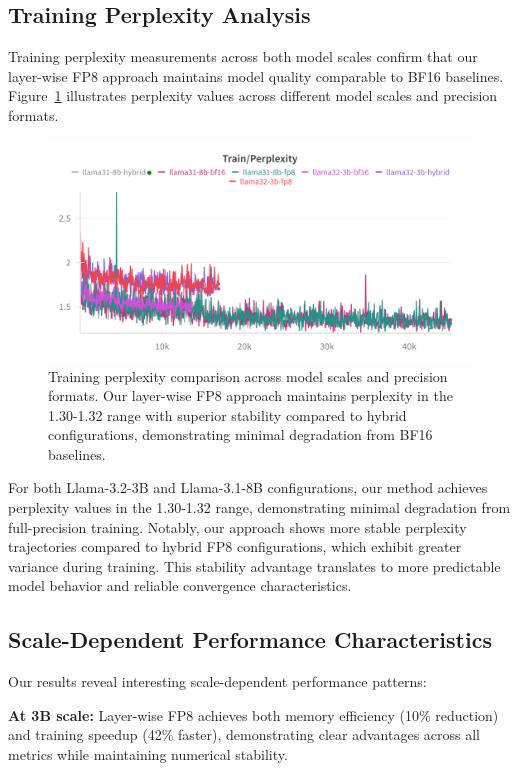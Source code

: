 \subsection{Training Perplexity Analysis}

Training perplexity measurements across both model scales confirm that our layer-wise FP8 approach maintains model quality comparable to BF16 baselines. Figure~\ref{fig:training_perplexity} illustrates perplexity values across different model scales and precision formats.

\begin{figure}[h]
    \centering
    \includegraphics[width=0.9\linewidth]{figures/c4/train_perplexity.png}
    \caption{Training perplexity comparison across model scales and precision formats. Our layer-wise FP8 approach maintains perplexity in the 1.30-1.32 range with superior stability compared to hybrid configurations, demonstrating minimal degradation from BF16 baselines.}
    \label{fig:training_perplexity}
\end{figure}

For both Llama-3.2-3B and Llama-3.1-8B configurations, our method achieves perplexity values in the 1.30-1.32 range, demonstrating minimal degradation from full-precision training. Notably, our approach shows more stable perplexity trajectories compared to hybrid FP8 configurations, which exhibit greater variance during training. This stability advantage translates to more predictable model behavior and reliable convergence characteristics.

\subsection{Scale-Dependent Performance Characteristics}

Our results reveal interesting scale-dependent performance patterns:

\textbf{At 3B scale:} Layer-wise FP8 achieves both memory efficiency (10\% reduction) and training speedup (42\% faster), demonstrating clear advantages across all metrics while maintaining numerical stability.

